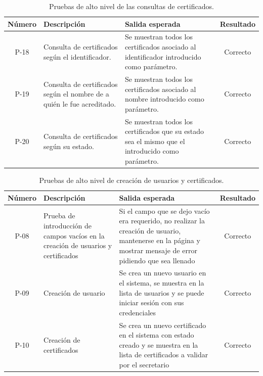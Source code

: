 \begin{table}[!h]
	\begin{center}
		\begin{tabular}{|c|p{5cm}|p{5cm}|c|}
				\hline \textbf{Número} & \textbf{Descripción} & \textbf{Salida esperada} &  \textbf{Resultado}\\ 
				\hline P-18 & Consulta de certificados según el identificador. & Se muestran todos los certificados asociado al identificador introducido como parámetro. & Correcto \\
				\hline P-19 & Consulta de certificados según el nombre de a quién le fue acreditado. & Se muestran todos los certificados asociado al nombre introducido como parámetro. & Correcto \\
				\hline P-20 & Consulta de certificados según su estado. & Se muestran todos los certificados que su estado sea el mismo que el introducido como parámetro. & Correcto \\
				\hline 
		\end{tabular}
		\caption{Pruebas de alto nivel de las consultas de certificados.}
		\label{tab:validateTest}
	\end{center}
\end{table}

\begin{table}[!h]
	\begin{center}
		\begin{tabular}{|c|p{4cm}|p{5cm}|c|}
		\hline \textbf{Número} & \textbf{Descripción} & \textbf{Salida esperada} &  \textbf{Resultado}\\ 
		\hline P-08 & Prueba de introducción de campos vacíos en la creación de usuarios y certificados & Si el campo que se dejo vacío era requerido, no realizar la creación de usuario, mantenerse en la página y mostrar mensaje de error pidiendo que sea llenado & Correcto \\
		\hline P-09 & Creación de usuario & Se crea un nuevo usuario en el sistema, se muestra en la lista de usuarios y se puede iniciar sesión con sus credenciales & Correcto \\
		\hline P-10 & Creación de certificados & Se crea un nuevo certificado en el sistema con estado creado y se muestra en la lista de certificados a validar por el secretario & Correcto \\
		\hline 
		\end{tabular}
		\caption{Pruebas de alto nivel de creación de usuarios y certificados.}
		\label{tab:createTest}
	\end{center}
\end{table}

